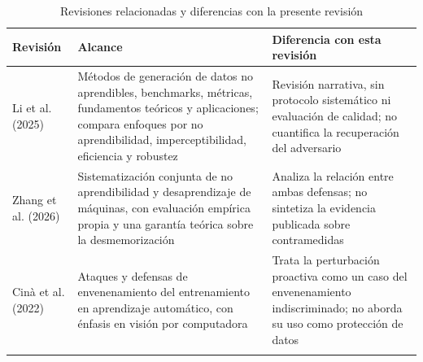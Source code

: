 \begin{table}[t]
\caption{Revisiones relacionadas y diferencias con la presente revisión}\label{tab:revisiones}
\footnotesize
\begin{tabularx}{\textwidth}{@{}L{3.0cm}Y{1.0}Y{1.0}@{}}
\toprule
Revisión & Alcance & Diferencia con esta revisión \\
\midrule
Li et al. (2025) \cite{li2025survey} & Métodos de generación de datos no aprendibles, benchmarks, métricas, fundamentos teóricos y aplicaciones; compara enfoques por no aprendibilidad, imperceptibilidad, eficiencia y robustez & Revisión narrativa, sin protocolo sistemático ni evaluación de calidad; no cuantifica la recuperación del adversario \\
Zhang et al. (2026) \cite{zhang2026sok} & Sistematización conjunta de no aprendibilidad y desaprendizaje de máquinas, con evaluación empírica propia y una garantía teórica sobre la desmemorización & Analiza la relación entre ambas defensas; no sintetiza la evidencia publicada sobre contramedidas \\
Cinà et al. (2022) \cite{cina2023wild} & Ataques y defensas de envenenamiento del entrenamiento en aprendizaje automático, con énfasis en visión por computadora & Trata la perturbación proactiva como un caso del envenenamiento indiscriminado; no aborda su uso como protección de datos \\
\botrule
\end{tabularx}
\end{table}

